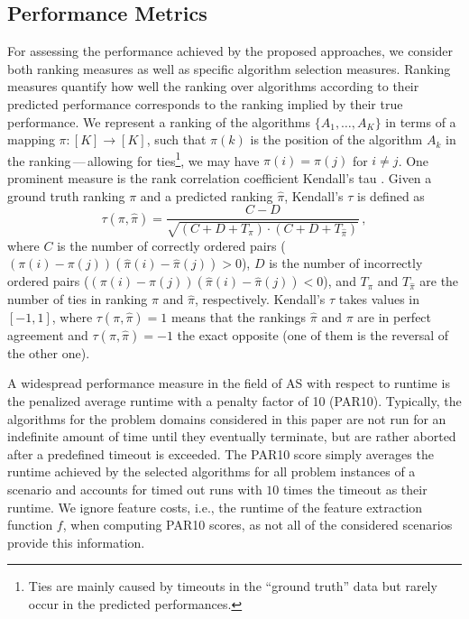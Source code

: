 \documentclass[runningheads]{llncs}
\begin{document}
\subsection{Performance Metrics}\label{subsec:performance_metrics}
For assessing the performance achieved by the proposed approaches, we consider both ranking measures as well as specific algorithm selection measures. Ranking measures quantify how well the ranking over algorithms according to their predicted performance corresponds to the ranking implied by their true performance. We represent a ranking of the algorithms $\{A_1,\dots,A_K\}$ in terms of a mapping $\pi \colon [K] \to [K]$, such that $\pi(k)$ is the position of the algorithm $A_k$ in the ranking\,---\,allowing for ties\footnote{Ties are mainly caused by timeouts in the ``ground truth'' data but rarely occur in the predicted performances.}, we may have $\pi(i) = \pi(j)$ for $i \neq j$. One prominent measure is the rank correlation coefficient Kendall's tau \cite{kendall_treatment_1945}. Given a ground truth ranking $\pi$ and a predicted ranking $\hat{\pi}$, Kendall's $\tau$ is defined as 
\begin{equation}
	\label{eq:kendall_tau}
	\tau(\pi,\hat{\pi}) = \frac{C-D}{\sqrt{(C+D+T_{\pi})\cdot(C+D+T_{\hat{\pi}})}} \, ,
\end{equation} 
where $C$ is the number of correctly ordered pairs ($(\pi(i)-\pi(j))(\hat{\pi}(i)-\hat{\pi}(j)) > 0$), $D$ is the number of incorrectly ordered pairs ($(\pi(i)-\pi(j))(\hat{\pi}(i)-\hat{\pi}(j)) < 0$), and $T_{\pi}$ and $T_{\hat{\pi}}$ are the number of ties in ranking $\pi$ and $\hat{\pi}$, respectively. Kendall's $\tau$ takes values in $[-1,1]$, where $\tau(\pi,\hat{\pi}) = 1$ means that the rankings $\hat{\pi}$ and $\pi$ are in perfect agreement and $\tau(\pi,\hat{\pi}) = -1$ the exact opposite (one of them is the reversal of the other one).

A widespread performance measure in the field of AS with respect to runtime is the penalized average runtime with a penalty factor of 10 (PAR10). Typically, the algorithms for the problem domains considered in this paper are not run for an indefinite amount of time until they eventually terminate, but are rather aborted after a predefined timeout is exceeded. The PAR10 score simply averages the runtime achieved by the selected algorithms for all problem instances of a scenario and accounts for timed out runs with $10$ times the timeout as their runtime. We ignore feature costs, i.e., the runtime of the feature extraction function $f$, when computing PAR10 scores, as not all of the considered scenarios provide this information.
\end{document}
